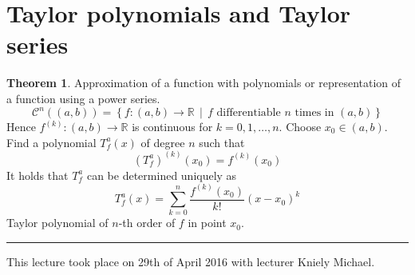 \documentclass[a4paper,landscape,twocolumn]{article}
\theoremstyle{definition}
\newtheorem{theorem}{Theorem}
\newcommand\setdef[2]{\left\{#1\,\middle|\,#2\right\}}
\newcommand\meta[3]{\hrule{} This #1 took place on #2 with lecturer #3.\par}
\begin{document}
\section{Taylor polynomials and Taylor series}
%
\begin{theorem}
  Approximation of a function with polynomials or representation
  of a function using a power series.
  \[
    \mathcal C^n((a,b))
    = \setdef{f: (a,b) \to \mathbb R}{f \text{ differentiable $n$ times in } (a,b)}
  \]
  Hence $f^{(k)}: (a,b) \to \mathbb R$ is continuous for $k = 0, 1, \ldots, n$.
  Choose $x_0 \in (a,b)$.
  Find a polynomial $T_f^a(x)$ of degree $n$ such that
  \[ \left(T_f^a\right)^{(k)}(x_0) = f^{(k)}(x_0) \]
  It holds that $T_f^a$ can be determined uniquely as
  \[ T_f^a(x) = \sum_{k=0}^n \frac{f^{(k)}(x_0)}{k!} (x - x_0)^k \]
  Taylor polynomial of $n$-th order of $f$ in point $x_0$.
\end{theorem}

\meta{lecture}{29th of April 2016}{Kniely Michael}
\end{document}
